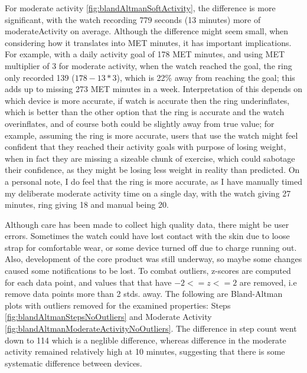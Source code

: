 For moderate activity \ref{fig:blandAltmanSoftActivity}, the difference is more significant, with the watch recording 779 seconds (13 minutes) more of moderateActivity on average. Although the difference might seem small, when considering how it translates into MET minutes, it has important implications. For example, with a daily activity goal of 178 MET minutes, and using MET multiplier of 3 for moderate activity, when the watch reached the goal, the ring only recorded 139 ($178 - 13 * 3$), which is 22\% away from reaching the goal; this adds up to missing 273 MET minutes in a week. Interpretation of this depends on which device is more accurate, if watch is accurate then the ring underinflates, which is better than the other option that the ring is accurate and the watch overinflates, and of course both could be slightly away from true value; for example, assuming the ring is more accurate, users that use the watch might feel confident that they reached their activity goals with purpose of losing weight, when in fact they are missing a sizeable chunk of exercise, which could sabotage their confidence, as they might be losing less weight in reality than predicted. On a personal note, I do feel that the ring is more accurate, as I have manually timed my deliberate moderate activity time on a single day, with the watch giving 27 minutes, ring giving 18 and manual being 20.

Although care has been made to collect high quality data, there might be user errors. Sometimes the watch could have lost contact with the skin due to loose strap for comfortable wear, or some device turned off due to charge running out. Also, development of the core product was still underway, so maybe some changes caused some notifications to be lost. To combat outliers, z-scores are computed for each data point, and values that that have $-2 <= z <= 2$ are removed, i.e remove data points more than 2 stds. away. The following are Bland-Altman plots with outliers removed for the examined properties: Steps \ref{fig:blandAltmanStepsNoOutliers} and Moderate Activity \ref{fig:blandAltmanModerateActivityNoOutliers}. The difference in step count went down to 114 which is a neglible difference, whereas difference in the moderate activity remained relatively high at 10 minutes, suggesting that there is some systematic difference between devices.

